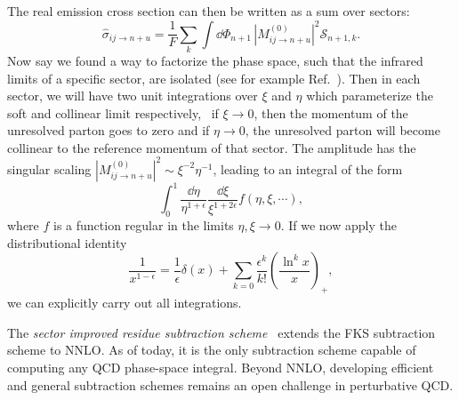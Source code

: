The real emission cross section can then be written as a sum over sectors:
\begin{equation}
\hat{\sigma}_{ij \rightarrow n+u} = \frac{1}{F} \sum_k \int \dd \Phi_{n + 1} \, |M_{ij \rightarrow n + u}^{(0)}|^2 \mathcal{S}_{n+1, k}.
\end{equation}
Now say we found a way to factorize the phase space, such that the infrared limits of a specific sector, are isolated (see for example Ref.~\cite{Czakon:2019tmo}). Then in each sector, we will have two unit integrations over $\xi$ and $\eta$ which parameterize the soft and collinear limit respectively, \ie\ if $\xi\rightarrow 0$, then the momentum of the unresolved parton goes to zero and if $\eta \rightarrow 0$, the unresolved parton will become collinear to the reference momentum of that sector. The amplitude has the singular scaling $|M_{ij \rightarrow n + u}^{(0)}|^2 \sim \xi^{-2} \eta^{-1}$, leading to an integral of the form
\begin{equation}
\int_0^1 \frac{\dd \eta}{\eta^{1 + \epsilon}} \frac{\dd \xi}{\xi^{1 + 2 \epsilon}} f(\eta, \xi, \cdots),
\end{equation}
where $f$ is a function regular in the limits $\eta, \xi \rightarrow 0$. If we now apply the distributional identity
\begin{equation}
\frac{1}{x^{1 - \epsilon}} = \frac{1}{\epsilon} \delta (x) + \sum_{k = 0} \frac{\epsilon^k}{k!} \left( \frac{\ln^k x}{x} \right)_+,
\label{eq:2:distributional_identity}
\end{equation}
we can explicitly carry out all integrations.

The \textit{sector improved residue subtraction scheme}~\cite{Czakon:2010td} extends the FKS subtraction scheme to \acs{NNLO}. As of today, it is the only subtraction scheme capable of computing any QCD phase-space integral. Beyond \acs{NNLO}, developing efficient and general subtraction schemes remains an open challenge in perturbative QCD.

